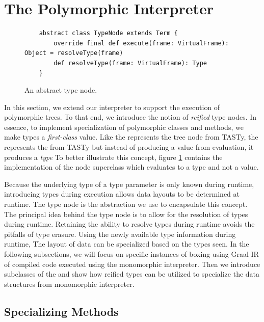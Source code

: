 \section{The Polymorphic Interpreter}
\label{implementation:specialization}

\begin{figure}[!htb]
	\begin{verbatim}
	abstract class TypeNode extends Term {
		override final def execute(frame: VirtualFrame): Object = resolveType(frame)
		def resolveType(frame: VirtualFrame): Type 
	}
	\end{verbatim}
	\caption{An abstract type node.}
	\label{impl:type-node}
\end{figure}

In this section, we extend our interpreter to support the execution of polymorphic trees.
To that end, we introduce the notion of \textit{reified} type nodes.
In essence, to implement specialization of polymorphic classes and methods, we make types a \textit{first-class} value.
Like the  represents the  tree node from TASTy, the  represents the  from TASTy but instead of producing a value from evaluation, it produces a \textit{type}
To better illustrate this concept, figure \ref{impl:type-node} contains the implementation of the node superclass which evaluates to a type and not a value.

Because the underlying type of a type parameter is only known during runtime, introducing types during execution allows data layouts to be determined at runtime.
The type node is the abstraction we use to encapsulate this concept.
The principal idea behind the type node is to allow for the resolution of types during runtime.
Retaining the ability to resolve types during runtime avoids the pitfalls of type erasure.
Using the newly available type information during runtime, The layout of data can be specialized based on the types seen.
In the following subsections, we will focus on specific instances of boxing using Graal IR of compiled code executed using the monomorphic interpreter.
Then we introduce subclasses of the  and show how reified types can be utilized to specialize the data structures from monomorphic interpreter.

\subsection{Specializing Methods}

